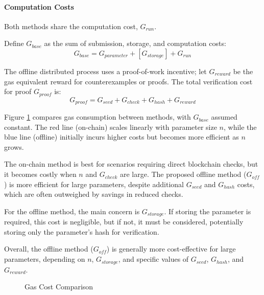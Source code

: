 \documentclass[runningheads]{llncs}
\begin{document}
\paragraph*{Computation Costs} Both methods share the computation cost, \( G_{run} \).

Define \( G_{base} \) as the sum of submission, storage, and computation costs:
\[
G_{base} = G_{parameter} + [G_{storage}] + G_{run}
\]

The offline distributed process uses a proof-of-work incentive; let \( G_{reward} \) be the gas equivalent reward for counterexamples or proofs. The total verification cost for proof \( G_{proof} \) is:
\[
G_{proof} = G_{seed} + G_{check} + G_{hash} + G_{reward}
\]

Figure \ref{fig:gas_compare} compares gas consumption between methods, with \( G_{base} \) assumed constant. The red line (on-chain) scales linearly with parameter size \( n \), while the blue line (offline) initially incurs higher costs but becomes more efficient as \( n \) grows.

The on-chain method is best for scenarios requiring direct blockchain checks, but it becomes costly when \( n \) and \( G_{check} \) are large. The proposed offline method (\( G_{off} \)) is more efficient for large parameters, despite additional \( G_{seed} \) and \( G_{hash} \) costs, which are often outweighed by savings in reduced checks.

For the offline method, the main concern is \( G_{storage} \). If storing the parameter is required, this cost is negligible, but if not, it must be considered, potentially storing only the parameter's hash for verification.

Overall, the offline method (\( G_{off} \)) is generally more cost-effective for large parameters, depending on \( n \), \( G_{storage} \), and specific values of \( G_{seed} \), \( G_{hash} \), and \( G_{reward} \).
\begin{figure}
  \centering
  \caption{Gas Cost Comparison}
  \label{fig:gas_compare}
\end{figure}
\end{document}
